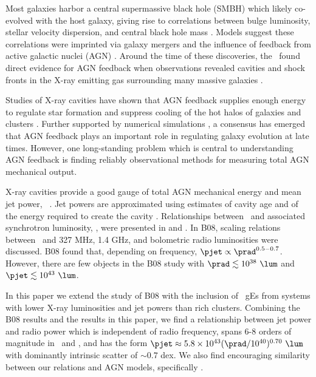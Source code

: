 \documentclass{emulateapj}
\begin{document}
Most galaxies harbor a central supermassive black hole (SMBH) which
likely co-evolved with the host galaxy, giving rise to correlations
between bulge luminosity, stellar velocity dispersion, and central
black hole mass \citep{1995ARA&A..33..581K, magorrian}. Models suggest
these correlations were imprinted via galaxy mergers and the influence
of feedback from active galactic nuclei (AGN)
\citep[\eg][]{1998A&A...331L...1S, 2000MNRAS.311..576K}. Around the
time of these discoveries, the \cxo\ found direct evidence for AGN
feedback when observations revealed cavities and shock fronts in the
X-ray emitting gas surrounding many massive galaxies
\citep[\eg][]{2000ApJ...534L.135M, perseus1, 2007ApJ...665.1057F}.

Studies of X-ray cavities have shown that AGN feedback supplies enough
energy to regulate star formation and suppress cooling of the hot
halos of galaxies and clusters \citep{birzan04, 2005MNRAS.364.1343D,
  rafferty06}. Further supported by numerical simulations
\citep[\eg][]{croton06, bower06}, a consensus has emerged that AGN
feedback plays an important role in regulating galaxy evolution at
late times. However, one long-standing problem which is central to
understanding AGN feedback is finding reliably observational methods
for measuring total AGN mechanical output.

X-ray cavities provide a good gauge of total AGN mechanical energy and
mean jet power, \pjet\ \citep{2000ApJ...534L.135M}. Jet powers are
approximated using estimates of cavity age and of the energy required
to create the cavity \citep{2001ApJ...554..261C,
  mcnamrev}. Relationships between \pjet\ and associated synchrotron
luminosity, \prad, were presented in \citet[][hereafter B04]{birzan04}
and \citet[][hereafter B08]{birzan08}. In B08, scaling relations
between \pjet\ and 327 MHz, 1.4 GHz, and bolometric radio luminosities
were discussed. B08 found that, depending on frequency, $\pjet \propto
\prad^{0.5-0.7}$. However, there are few objects in the B08 study with
$\prad \lesssim 10^{38} ~\lum$ and $\pjet \lesssim 10^{43} ~\lum$.

In this paper we extend the study of B08 with the inclusion of
\samp\ gEs from systems with lower X-ray luminosities and jet powers
than rich clusters. Combining the B08 results and the results in this
paper, we find a relationship between jet power and radio power which
is independent of radio frequency, spans 6-8 orders of magnitude in
\pjet\ and \prad, and has the form $\pjet \approx 5.8 \times 10^{43}
(\prad/10^{40})^{0.70} ~\lum$ with dominantly intrinsic scatter of
$\sim 0.7$ dex. We also find encouraging similarity between our
relations and AGN models, specifically \citet{w99}.
\end{document}

